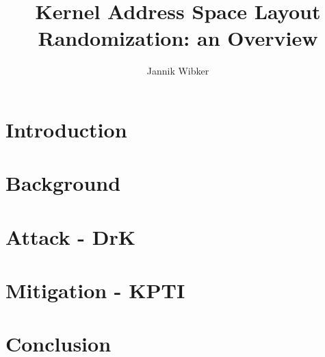 \documentclass[10pt,twocolumn,a4paper]{article}
\author{Jannik Wibker}
\begin{document}
\title{ Kernel Address Space Layout Randomization: an Overview }

\newcommand{\todo}[1]{{\texttt{[#1]}}}
\newcommand{\code}[1]{{\lstinline[basicstyle=\ttfamily]{#1}}}

\maketitle

\begin{abstract}

\end{abstract}

\section{Introduction}\label{sec:introduction}



\section{Background}\label{sec:background}



\section{Attack - DrK}\label{sec:drk}



\section{Mitigation - KPTI}\label{sec:kpti}



\section{Conclusion}\label{sec:conclusion}





\end{document}
